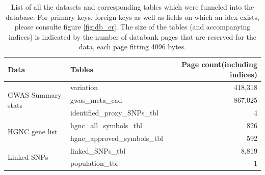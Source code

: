     \begin{table}[h!]
    \capstart
    \centering
    \begin{minipage}{\captionwidth}
        \caption[db tables]{\newline
    List of all the datasets and corresponding tables which were funneled into the database. For primary keys, foreign keys as well as fields on which an idex exists, please consulte figure \ref{fig:db_er}. The size of the tables (and accompanying indices) is indicated by the number of databank pages that are reserved for the data, each page fitting 4096 bytes.}
        \label{tab:db_tables}
    \end{minipage}
        \begin{tabular}{l|l|r}
        Data                                       & Tables                             & Page count\newline (including indices)                                                                      \\ \hline
        \multirow{3}{*}{GWAS Summary stats}        & variation                          & 418,318                                                                                              \\
                                                   & gwas\_meta\_cad                    & 867,025                                                                                              \\
                                                   & identified\_proxy\_SNPs\_tbl       & 4                                                                                                   \\ \hline
        \multirow{2}{*}{HGNC gene list}            & hgnc\_all\_symbols\_tbl            & 826                                                                                                 \\
                                                   & hgnc\_approved\_symbols\_tbl       & 592                                                                                                 \\ \hline
        \multirow{3}{*}{Linked SNPs}               & linked\_SNPs\_tbl                  & 8,819                                                                                                \\
                                                   & population\_tbl                    & 1                                                                                                   \\

\end{tabular}
\end{table}
